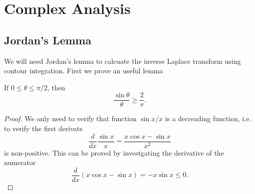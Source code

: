 \chapter{Complex Analysis}

\section{Jordan's Lemma}
We will need Jordan's lemma to calcuate the inverse Laplace transform using
contour integration. First we prove an useful lemma

\begin{lemma} \label{L:sine}
If $0\le \theta \le \pi/2$, then
\begin{equation}
  \frac{\sin{\theta}}{\theta} \ge \frac{2}{\pi}.
\end{equation}
\end{lemma}
\begin{proof}
We only need to verify that function $\sin{x}/x$ is a decreading function, 
i.e. to verify the first derivate
\[
  \frac{d}{dx} \frac{\sin{x}}{x} = \frac{x\cos{x}-\sin{x}}{x^2}
\]
is non-positive. This can be proved by investgating the derivative of the
numerator
\[
  \frac{d}{dx} (x\cos{x}-\sin{x}) = -x\sin{x} \le 0.
\]
\end{proof}

